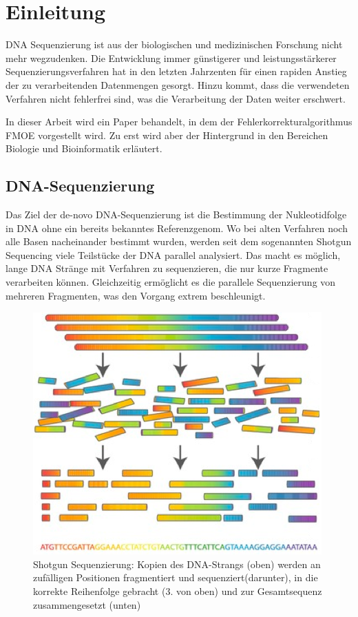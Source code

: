 \chapter{Einleitung}
\label{ch:einleitung}

DNA Sequenzierung ist aus der biologischen und medizinischen Forschung nicht mehr wegzudenken.
Die Entwicklung immer günstigerer und leistungsstärkerer Sequenzierungsverfahren hat in den letzten Jahrzenten für einen rapiden Anstieg der zu verarbeitenden Datenmengen gesorgt.
Hinzu kommt, dass die verwendeten Verfahren nicht fehlerfrei sind, was die Verarbeitung der Daten weiter erschwert.

In dieser Arbeit wird ein Paper behandelt, in dem der Fehlerkorrekturalgorithmus FMOE vorgestellt wird.
Zu erst wird aber der Hintergrund in den Bereichen Biologie und Bioinformatik erläutert.

\section{DNA-Sequenzierung}
\label{s:dna-seq} 

Das Ziel der de-novo DNA-Sequenzierung ist die Bestimmung der Nukleotidfolge in DNA ohne ein bereits bekanntes Referenzgenom.
Wo bei alten Verfahren noch alle Basen nacheinander bestimmt wurden, werden seit dem sogenannten Shotgun Sequencing viele Teilstücke der DNA parallel analysiert.
Das macht es möglich, lange DNA Stränge mit Verfahren zu sequenzieren, die nur kurze Fragmente verarbeiten können. %
Gleichzeitig ermöglicht es die parallele Sequenzierung von mehreren Fragmenten, was den Vorgang extrem beschleunigt.

\begin{figure}[h]
	\begin{center}
		\includegraphics[width=.5\columnwidth]{./img/shotgun_sequencing.png}
	\end{center}
	\caption{Shotgun Sequenzierung: Kopien des DNA-Strangs (oben) werden an zufälligen Positionen fragmentiert und sequenziert(darunter), in die korrekte Reihenfolge gebracht (3. von oben) und zur Gesamtsequenz zusammengesetzt (unten)}
	\label{fig:shotgun-sequencing}
\end{figure}

